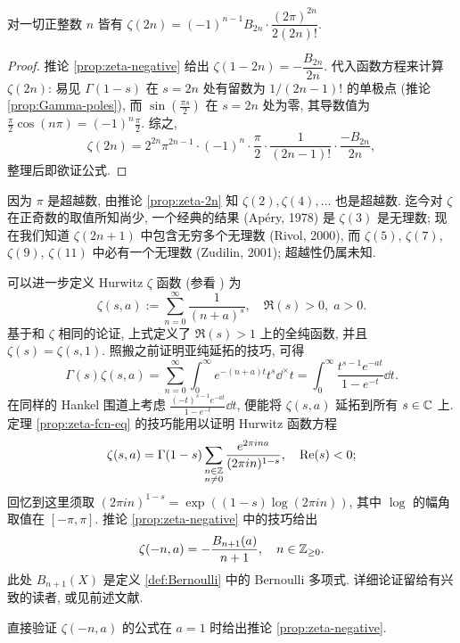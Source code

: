 \begin{corollary}\label{prop:zeta-2n}
	对一切正整数 $n$ 皆有 $\zeta(2n) = (-1)^{n-1} B_{2n} \cdot \dfrac{(2\pi)^{2n}}{2(2n)!}$.
\end{corollary}
\begin{proof}
	推论 \ref{prop:zeta-negative} 给出 $\zeta(1-2n) = -\dfrac{B_{2n}}{2n}$. 代入函数方程来计算 $\zeta(2n)$: 易见 $\Gamma(1-s)$ 在 $s=2n$ 处有留数为 $1/(2n-1)!$ 的单极点 (推论 \ref{prop:Gamma-poles}), 而 $\sin\left(\frac{\pi s}{2} \right)$ 在 $s=2n$ 处为零, 其导数值为 $\frac{\pi}{2}\cos(n\pi) = (-1)^n \frac{\pi}{2}$. 综之,
	\[ \zeta(2n) = 2^{2n} \pi^{2n-1} \cdot (-1)^n \cdot \frac{\pi}{2} \cdot \frac{1}{(2n-1)!} \cdot \frac{-B_{2n}}{2n}, \]
	整理后即欲证公式.
\end{proof}

因为 $\pi$ 是超越数, 由推论 \ref{prop:zeta-2n} 知 $\zeta(2), \zeta(4), \ldots$ 也是超越数. 迄今对 $\zeta$ 在正奇数的取值所知尚少, 一个经典的结果 (Apéry, 1978) 是 $\zeta(3)$ 是无理数; 现在我们知道 $\zeta(2n+1)$ 中包含无穷多个无理数 (Rivol, 2000), 而 $\zeta(5)$, $\zeta(7)$, $\zeta(9)$, $\zeta(11)$ 中必有一个无理数 (Zudilin, 2001); 超越性仍属未知.

\begin{remark}\label{rem:Hurwitz-zeta}  
	可以进一步定义 Hurwitz $\zeta$ 函数 (参看 \cite[\S 3.15]{GW}) 为
	\[ \zeta(s, a) := \sum_{n=0}^\infty \frac{1}{(n+a)^s}, \quad \Re(s) > 0, \; a > 0. \]
	基于和 $\zeta$ 相同的论证, 上式定义了 $\Re(s) > 1$ 上的全纯函数, 并且 $\zeta(s) = \zeta(s,1)$. 照搬之前证明亚纯延拓的技巧, 可得
	\[ \Gamma(s) \zeta(s,a) = \sum_{n=0}^\infty \int_0^\infty e^{-(n+a)t} t^s \dd^\times t = \int_0^\infty \frac{t^{s-1} e^{-at}}{1 - e^{-t}} \dd t. \]
	在同样的 Hankel 围道上考虑 $\frac{(-t)^{s-1} e^{-at}}{1 - e^{-t}} \dd t$, 便能将 $\zeta(s,a)$ 延拓到所有 $s \in \mathbb{C}$ 上. 定理 \ref{prop:zeta-fcn-eq} 的技巧能用以证明 Hurwitz 函数方程
	\[ \zeta(s, a) = \Gamma(1-s) \sum_{\substack{n \in \mathbb{Z} \\ n \neq 0 }} \frac{e^{2\pi ina}}{(2\pi i n)^{1-s}}, \quad \operatorname{Re}(s) < 0; \]
	回忆到这里须取 $(2\pi in)^{1-s} = \exp\left( (1-s) \log (2\pi in)\right)$, 其中 $\log$ 的幅角取值在 $[-\pi, \pi]$. 推论 \ref{prop:zeta-negative} 中的技巧给出
	\[ \zeta(-n, a) = - \frac{B_{n+1}(a)}{n+1}, \quad n \in \mathbb{Z}_{\geq 0}. \]
	此处 $B_{n+1}(X)$ 是定义 \ref{def:Bernoulli} 中的 Bernoulli 多项式. 详细论证留给有兴致的读者, 或见前述文献.
\end{remark}

\begin{exercise}
	直接验证 $\zeta(-n, a)$ 的公式在 $a = 1$ 时给出推论 \ref{prop:zeta-negative}.
\end{exercise}

